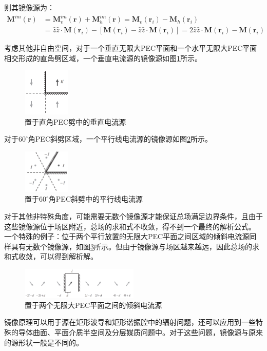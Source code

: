 \documentclass{article}
\numberwithin{equation}{section}
\renewcommand{\vec}[1]{\boldsymbol{#1}}
\begin{document}
则其镜像源为：
\begin{align}
    \label{eq:eq176}
    \mathbf{M}^{im}(\vec{r})&=\mathbf{M}^{im}_v(\vec{r})+\mathbf{M}^{im}_h(\vec{r})=\mathbf{M}_v(\vec{r}_i)-\mathbf{M}_h(\vec{r}_i) \nonumber \\
                            &=\hat{z}\hat{z}\cdot\mathbf{M}(\vec{r}_i)-[\mathbf{M}(\vec{r}_i)-\hat{z}\hat{z}\cdot\mathbf{M}(\vec{r}_i)]=2\hat{z}\hat{z}\cdot\mathbf{M}(\vec{r}_i)-\mathbf{M}(\vec{r}_i)
\end{align}
\par
考虑其他非自由空间，对于一个垂直无限大PEC平面和一个水平无限大PEC平面相交形成的直角劈区域，一个垂直电流源的镜像源如图\ref{fig:fig9}所示。
\begin{figure}[ht]
    \centering
    \includegraphics[width=0.2\textwidth]{置于直角PEC劈中的垂直电流源.PNG}
    \caption{置于直角PEC劈中的垂直电流源}
    \label{fig:fig9}
\end{figure}
\par
对于$60^\circ $角PEC斜劈区域，一个平行线电流源的镜像源如图\ref{fig:fig10}所示。
\begin{figure}[ht]
    \centering
    \includegraphics[width=0.2\textwidth]{置于60角PEC斜劈中的平行线电流源.PNG}
    \caption{置于$60^\circ $角PEC斜劈中的平行线电流源}
    \label{fig:fig10}
\end{figure}
\par
对于其他非特殊角度，可能需要无数个镜像源才能保证总场满足边界条件，且由于这些镜像源位于场区附近，总场的求和式不收敛，得不到一个最终的解析公式。
一个特殊的例子：位于两个平行放置的无限大PEC平面之间区域的倾斜电流源同样具有无数个镜像源，如图\ref{fig:fig11}所示。但由于镜像源与场区越来越远，因此总场的求和式收敛，可以得到解析解。
\begin{figure}[ht]
    \centering
    \includegraphics[width=0.5\textwidth]{置于两个无限大PEC平面之间的倾斜电流源.PNG}
    \caption{置于两个无限大PEC平面之间的倾斜电流源}
    \label{fig:fig11}
\end{figure}
\par
镜像原理可以用于源在矩形波导和矩形谐振腔中的辐射问题，还可以应用到一些特殊的导体曲面、平面介质半空间及分层媒质问题中。对于这些问题，镜像源与原来的源形状一般是不同的。
\end{document}
